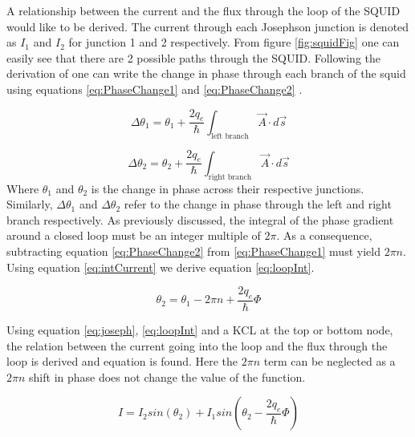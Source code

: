 A relationship between the current and the flux through the loop of the SQUID would like to be derived. The current through each Josephson junction is denoted as $I_1$ and $I_2$ for junction 1 and 2 respectively. From figure \ref{fig:squidFig} one can easily see that there are 2 possible paths through the SQUID. Following the derivation of \cite{Feynman_Leighton_Sands_2013} one can write the change in phase through each branch of the squid using equations \ref{eq:PhaseChange1} and \ref{eq:PhaseChange2} \cite{Feynman_Leighton_Sands_2013}.

\begin{equation}
    \Delta\theta_{1} = \theta_1 + \frac{2q_e}{\hbar}\int_{\text{left branch}} \Vec{A}\cdot d\Vec{s}
    \label{eq:PhaseChange1}
\end{equation}

\begin{equation}
    \Delta\theta_{2} = \theta_2 + \frac{2q_e}{\hbar}\int_{\text{right branch}} \Vec{A}\cdot d\Vec{s}
    \label{eq:PhaseChange2}
\end{equation}
Where $\theta_1$ and $\theta_2$ is the change in phase across their respective junctions. Similarly, $\Delta\theta_1$ and $\Delta\theta_2$ refer to the change in phase through the left and right branch respectively. As previously discussed, the integral of the phase gradient around a closed loop must be an integer multiple of $2\pi$. As a consequence, subtracting equation \ref{eq:PhaseChange2} from \ref{eq:PhaseChange1} must yield $2\pi n$. Using equation \ref{eq:intCurrent} we derive equation \ref{eq:loopInt}.

\begin{equation}
    \theta_2  = \theta_1 - 2\pi n + \frac{2q_e}{\hbar}\Phi
    \label{eq:loopInt}
\end{equation}

Using equation \ref{eq:joseph}, \ref{eq:loopInt} and a KCL at the top or bottom node, the relation between the current going into the loop and the flux through the loop is derived and equation is found. Here the $2\pi n$ term can be neglected as a $2\pi n$ shift in phase does not change the value of the function. 

\begin{equation}
    I = I_2sin(\theta_2) + I_1sin(\theta_2 - \frac{2q_e}{\hbar}\Phi)
    \label{eq:squidI}
\end{equation}

